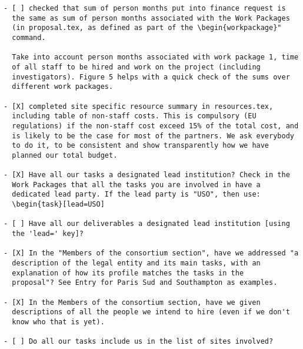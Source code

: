 \begin{draft}
\vspace{1cm}

\begin{verbatim}
- [ ] checked that sum of person months put into finance request is
  the same as sum of person months associated with the Work Packages
  (in proposal.tex, as defined as part of the \begin{workpackage}"
  command.
  
  Take into account person months associated with work package 1, time
  of all staff to be hired and work on the project (including
  investigators). Figure 5 helps with a quick check of the sums over
  different work packages.

- [X] completed site specific resource summary in resources.tex,
  including table of non-staff costs. This is compulsory (EU
  regulations) if the non-staff cost exceed 15% of the total cost, and
  is likely to be the case for most of the partners. We ask everybody
  to do it, to be consistent and show transparently how we have
  planned our total budget.

- [X] Have all our tasks a designated lead institution? Check in the
  Work Packages that all the tasks you are involved in have a
  dedicated lead party. If the lead party is "USO", then use:
  \begin{task}[lead=USO]

- [ ] Have all our deliverables a designated lead institution [using
  the 'lead=' key]?

- [X] In the "Members of the consortium section", have we addressed "a
  description of the legal entity and its main tasks, with an
  explanation of how its profile matches the tasks in the
  proposal"? See Entry for Paris Sud and Southampton as examples.

- [X] In the Members of the consortium section, have we given
  descriptions of all the people we intend to hire (even if we don't
  know who that is yet). 
  
- [ ] Do all our tasks include us in the list of sites involved?
\end{verbatim}
\end{draft}




